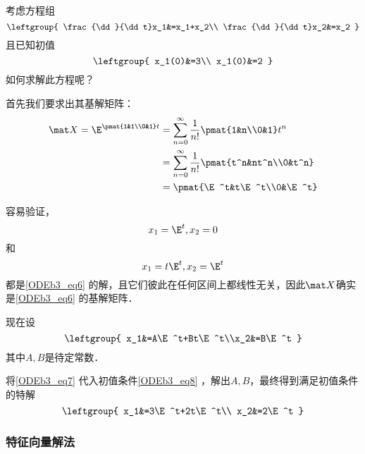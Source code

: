 \begin{example}{}
考虑方程组
\begin{equation}\label{ODEb3_eq6}
\leftgroup{
    \frac{\dd}{\dd t}x_1&=x_1+x_2\\
    \frac{\dd}{\dd t}x_2&=x_2
}
\end{equation}
且已知初值
\begin{equation}\label{ODEb3_eq8}
\leftgroup{
    x_1(0)&=3\\
    x_1(0)&=2
}
\end{equation}
如何求解此方程呢？

首先我们要求出其基解矩阵：
\begin{equation}
\begin{aligned}
\mat X=\E^{\pmat{1&1\\0&1}t}&=\sum_{n=0}^\infty\frac{1}{n!}\pmat{1&n\\0&1}t^n\\
&=\sum_{n=0}^\infty\frac{1}{n!}\pmat{t^n&nt^n\\0&t^n}\\
&=\pmat{\E^t&t\E^t\\0&\E^t}
\end{aligned}
\end{equation}

容易验证，
\begin{equation}
x_1=\E^t, x_2=0
\end{equation}
和
\begin{equation}
x_1=t\E^t, x_2=\E^t
\end{equation}
都是\autoref{ODEb3_eq6} 的解，且它们彼此在任何区间上都线性无关，因此$\mat X$确实是\autoref{ODEb3_eq6} 的基解矩阵．

现在设
\begin{equation}\label{ODEb3_eq7}
\leftgroup{
x_1&=A\E^t+Bt\E^t\\x_2&=B\E^t
}
\end{equation}
其中$A, B$是待定常数．

将\autoref{ODEb3_eq7} 代入初值条件\autoref{ODEb3_eq8} ，解出$A, B$，最终得到满足初值条件的特解
\begin{equation}
\leftgroup{
    x_1&=3\E^t+2t\E^t\\
    x_2&=2\E^t
}
\end{equation}


\end{example}

\subsubsection{特征向量解法}

